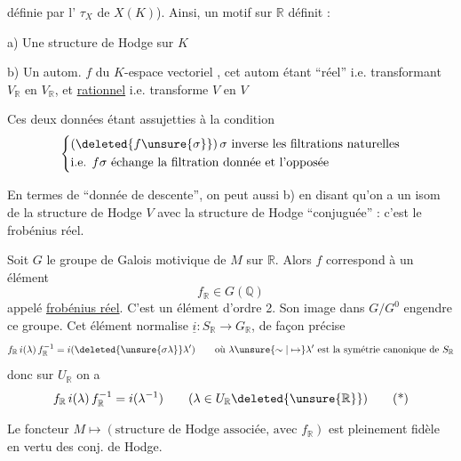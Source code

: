 définie par l'  $\tau_X$ de $X(K)$). Ainsi, un
motif sur $\mathbb R$ définit :

a) Une structure de Hodge  sur $K$

b) Un autom. $f$  du $K$-espace vectoriel ,
cet autom étant ``réel'' i.e.  transformant $V_{\mathbb R}$ en $V_{\mathbb R}$,
 et \unsure{$=$} \uline{rationnel} i.e. transforme $V$ en $V$

Ces deux données étant assujetties à la condition
\[
\left\{\begin{aligned}
 &( \deleted{f\unsure{\sigma}} )\,\sigma\ \text{inverse les filtrations naturelles}\\
 &\text{i.e. } f\sigma\ \text{échange la filtration donnée et l'opposée}
\end{aligned}\right.
\]

En termes de ``donnée de descente'', on peut 
aussi b) en disant qu'on a un isom
de la structure de Hodge $V$ avec la structure de
Hodge  ``conjuguée'' : c'est le frobénius réel.

Soit $G$ le groupe de Galois motivique de $M$ sur $\mathbb R$.
Alors $f$ correspond à un élément
\[
f_{\mathbb R}\in G(\mathbb Q)
\]
appelé \uline{frobénius réel}. C'est un élément d'ordre 2.
Son image dans $G/G^0$ engendre ce groupe. Cet
élément normalise $\underline i:S_{\mathbb R}\longrightarrow G_{\mathbb R}$, de façon précise
\[
f_{\mathbb R}\,i(\lambda)\,f_{\mathbb R}^{-1}=i(\deleted{\unsure{\sigma\lambda}}\lambda')
\qquad\text{où }\lambda\unsure{\sim|\mapsto}\lambda'\ \text{est la symétrie canonique de }S_{\mathbb R}
\]
donc sur $U_{\mathbb R}$ on a
\[
 f_{\mathbb R}\,i(\lambda)\,f_{\mathbb R}^{-1}=i(\lambda^{-1})
 \qquad(\lambda\in U_{\mathbb R}\deleted{\unsure{\mathbb R}}) \tag*{(*)}
\]

Le foncteur $M\longmapsto(\text{structure de Hodge associée, avec }f_{\mathbb R})$
est pleinement fidèle en vertu des conj. de Hodge.

